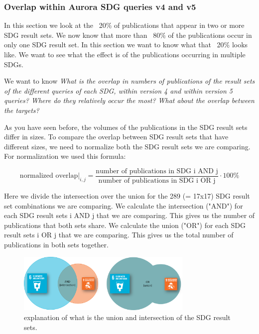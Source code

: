 \documentclass{article}
\begin{document}
\subsubsection{Overlap within Aurora SDG queries v4 and v5}
In this section we look at the ~20\% of publications that appear in two or more SDG result sets. We now know that more than ~80\% of the publications occur in only one SDG result set. In this section we want to know what that ~20\% looks like. We want to see what the effect is of the publications occurring in multiple SDGs.

We want to know \emph{What is the overlap in numbers of publications of the result sets of the different queries of each SDG, within version 4 and within version 5 queries? Where do they relatively occur the most? What about the overlap between the targets?}

As you have seen before, the volumes of the publications in the SDG result sets differ in sizes. To compare the overlap between SDG result sets that have different sizes, we need to normalize both the SDG result sets we are comparing. For normalization we used this formula:

\begin{equation*}
    \left.\text{normalized overlap}\right|_{i,j} = \frac{\text{number of publications in SDG i AND j}}{\text{number of publications in SDG i OR j}}\cdot 100\%
\end{equation*}

Here we divide the intersection over the union for the 289 (= 17x17) SDG result set combinations we are comparing. 
We calculate the intersection ("AND") for each  SDG result sets i AND j that we are comparing. This gives us the number of publications that both sets share.
We calculate the union ("OR") for each  SDG result sets i OR j that we are comparing. This gives us the total number of publications in both sets together.

\begin{figure}[H]
	\centering
  \includegraphics[width=0.75\textwidth]{figures/SDG-OR-AND-venn-diagrams.png}
	\caption{explanation of what is the union and intersection of the SDG result sets.}
\end{figure}
\end{document}
